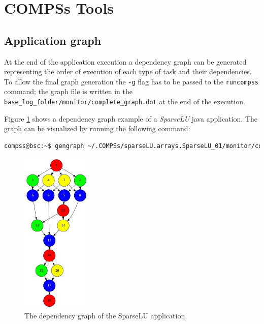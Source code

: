 \section{COMPSs Tools}
\label{sec:Tools}

\subsection{Application graph}
At the end of the application execution a dependency graph can be generated representing the order of execution of each type of 
task and their dependencies. To allow the final graph generation the \texttt{-g} flag has to be passed to the \texttt{runcompss} command; the graph file is written in the \texttt{base\_log\_folder/monitor/complete\_graph.dot} at the end of the execution.

Figure \ref{fig:complete_graph} shows a dependency graph example of a \textit{SparseLU} java application. The graph can be
visualized by running the following command:
\begin{lstlisting}[language=bash]
compss@bsc:~$ gengraph ~/.COMPSs/sparseLU.arrays.SparseLU_01/monitor/complete_graph.dot
\end{lstlisting}

\begin{figure}[h!]
  \centering
    \includegraphics[width=0.3\textwidth]{./Sections/4_Tools/Figures/dependency_graph.jpeg}
    \caption{The dependency graph of the SparseLU application}
    \label{fig:complete_graph}
\end{figure}



